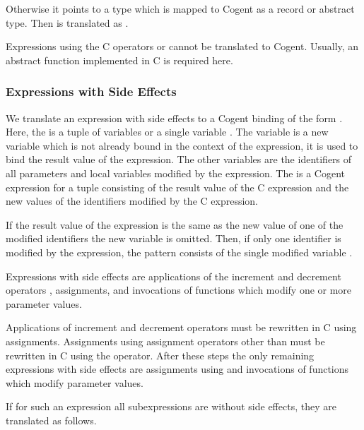 Otherwise it points to a type which is mapped to Cogent as a record or abstract type. Then  is translated as . 

Expressions using the C operators  or  cannot be translated to Cogent. Usually, an abstract
function implemented in C is required here.

\subsubsection{Expressions with Side Effects}

We translate an expression with side effects to a Cogent binding of the form . Here, the
 is a tuple of variables  or a single variable . The variable  is a
new variable which is not already bound in the context of the expression, it is used to bind the result value of the
expression. The other variables are the identifiers of all parameters and local variables modified by the expression.
The  is a Cogent expression for a tuple consisting of the result value of the C expression and the new values
of the identifiers modified by the C expression.

If the result value of the expression is the same as the new value of one of the modified identifiers the new variable
is omitted. Then, if only one identifier is modified by the expression, the pattern consists of the single modified variable 
.

Expressions with side effects are applications of the increment and decrement operators \code{++,--}, assignments,
and invocations of functions which modify one or more parameter values.

Applications of increment and decrement operators must be rewritten in C using assignments. Assignments using assignment
operators other than \code{=} must be rewritten in C using the \code{=} operator. After these steps the only 
remaining expressions with side effects are assignments using \code{=} and invocations of functions which modify parameter 
values.

If for such an expression all subexpressions are without side effects, they are translated as follows. 

